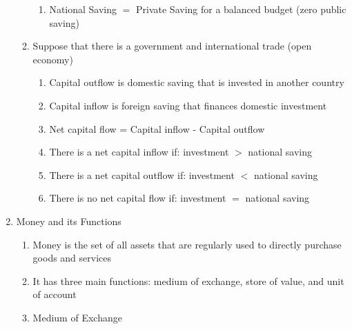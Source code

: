 \documentclass[12pt]{article}
\begin{document}
\begin{enumerate}
\begin{enumerate}
\begin{enumerate}
              \item National Saving $=$ Private Saving for a balanced budget (zero public saving)

            \end{enumerate}

          \item Suppose that there is a government and international trade (open economy)

            \begin{enumerate}

              \item Capital outflow is domestic saving that is invested in another country

              \item Capital inflow is foreign saving that finances domestic investment

              \item Net capital flow = Capital inflow - Capital outflow

              \item There is a net capital inflow if: investment $>$ national saving

              \item There is a net capital outflow if: investment $<$ national saving

              \item There is no net capital flow if: investment $=$ national saving

            \end{enumerate}

        \end{enumerate}

      \item Money and its Functions

        \begin{enumerate}

          \item Money is the set of all assets that are regularly used to directly purchase goods and services

          \item It has three main functions: medium of exchange, store of value, and unit of account

          \item Medium of Exchange

            \begin{enumerate}


\end{enumerate}
\end{enumerate}
\end{enumerate}
\end{document}
